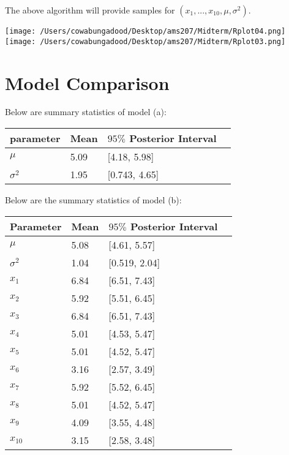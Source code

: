 \documentclass{asaproc}
\begin{document}
The above algorithm will provide samples for $(x_{1},...,x_{10}, \mu, \sigma^2)$.

\texttt{[image: /Users/cowabungadood/Desktop/ams207/Midterm/Rplot04.png]}
\texttt{[image: /Users/cowabungadood/Desktop/ams207/Midterm/Rplot03.png]}



\section{Model Comparison}
Below are summary statistics of model (a): 
\begin{center}
    \begin{tabular}{ | l | l | l | p{5cm} |}
    \hline
    parameter & Mean & $95\%$ Posterior Interval \\ \hline
    $\mu$ & 5.09 & [4.18, 5.98]   \\ \hline
    $\sigma^2$ & 1.95 & [0.743, 4.65] \\ \hline
     \end{tabular}
\end{center}

Below are the summary statistics of model (b):

\begin{center}
    \begin{tabular}{ | l | l | l | p{5cm} |}
    \hline
    Parameter & Mean & $95\%$ Posterior Interval \\ \hline
    $\mu$ & 5.08 & [4.61, 5.57]   \\ \hline
    $\sigma^2$ & 1.04 & [0.519, 2.04] \\ \hline
    $x_{1}$ & 6.84 & [6.51, 7.43] \\ \hline
    $x_{2}$ & 5.92 & [5.51, 6.45] \\ \hline
    $x_{3}$  & 6.84 & [6.51, 7.43] \\ \hline
    $x_{4}$  & 5.01 & [4.53, 5.47] \\ \hline
    $x_{5}$  & 5.01 & [4.52, 5.47] \\ \hline
    $x_{6}$  & 3.16 & [2.57, 3.49] \\ \hline
    $x_{7}$  & 5.92 & [5.52, 6.45] \\ \hline
    $x_{8}$  & 5.01 & [4.52, 5.47] \\ \hline
    $x_{9}$  & 4.09 & [3.55, 4.48] \\ \hline
    $x_{10}$  & 3.15 & [2.58, 3.48] \\ \hline
    \end{tabular}
\end{center}
\end{document}
